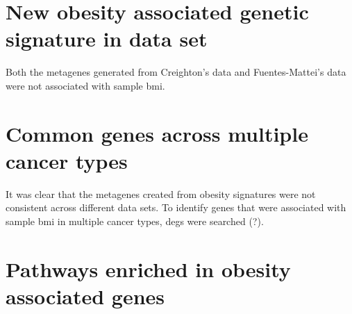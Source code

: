 \noindent



\section{New obesity associated genetic signature in \citet{Creighton2012} data set}
\label{sec:creighton_obesity_metagene_new}

Both the metagenes generated from Creighton's data and Fuentes-Mattei's data were not associated with sample \gls{bmi}.








\section{Common genes across multiple cancer types}
\label{sec:common_genes_across_multiple_cancer_types}

It was clear that the metagenes created from obesity signatures were not consistent across different data sets.
To identify genes that were associated with sample \gls{bmi} in multiple cancer types, \glspl{deg} were searched (?).







\section{Pathways enriched in obesity associated genes}
\label{sec:pathways_enriched_in_obesity_associated_genes}












